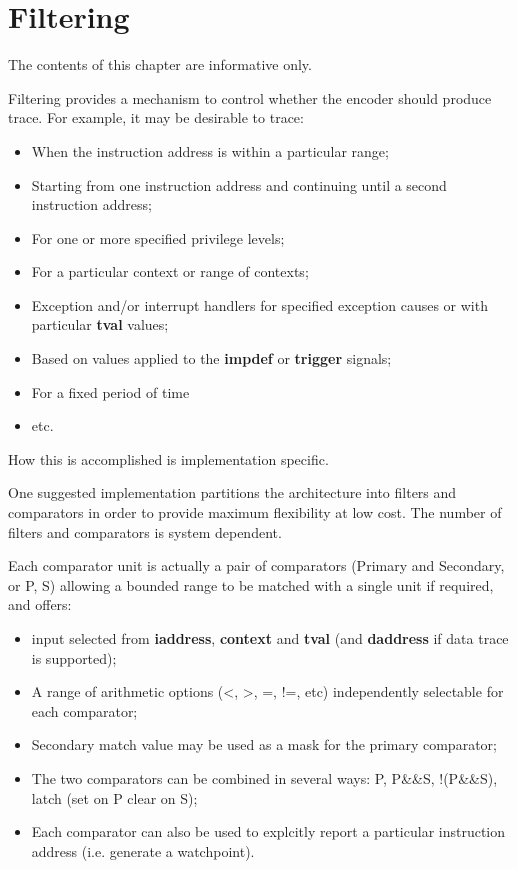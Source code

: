 \chapter{Filtering} \label{ch:filtering}

The contents of this chapter are informative only.

Filtering provides a mechanism to control whether the encoder should produce trace.  For example,
it may be desirable to trace:

\begin{itemize}
  \item When the instruction address is within a particular range;
  \item Starting from one instruction address and continuing until a second instruction address;
  \item For one or more specified privilege levels;
  \item For a particular context or range of contexts;
  \item Exception and/or interrupt handlers for specified exception causes or with particular \textbf{tval} values;
  \item Based on values applied to the \textbf{impdef} or \textbf{trigger} signals;
  \item For a fixed period of time
  \item etc.
\end{itemize}

How this is accomplished is implementation specific.  

One suggested implementation partitions the architecture into filters and comparators in order to provide maximum flexibility at 
low cost.  The number of filters and comparators is system dependent.

Each comparator unit is actually a pair of comparators (Primary and Secondary, or P, S) allowing a bounded range to be matched with a single unit
if required, and offers:

\begin{itemize}
  \item input selected from \textbf{iaddress}, \textbf{context} and \textbf{tval} (and \textbf{daddress} if data
    trace is supported);
  \item A range of arithmetic options (<, >, =, !=, etc) independently selectable for each comparator;
  \item Secondary match value may be used as a mask for the primary comparator;
  \item The two comparators can be combined in several ways: P, P\&\&S, !(P\&\&S), latch (set on P clear on S);
  \item Each comparator can also be used to explcitly report a particular instruction address (i.e. generate a watchpoint).
\end{itemize}

